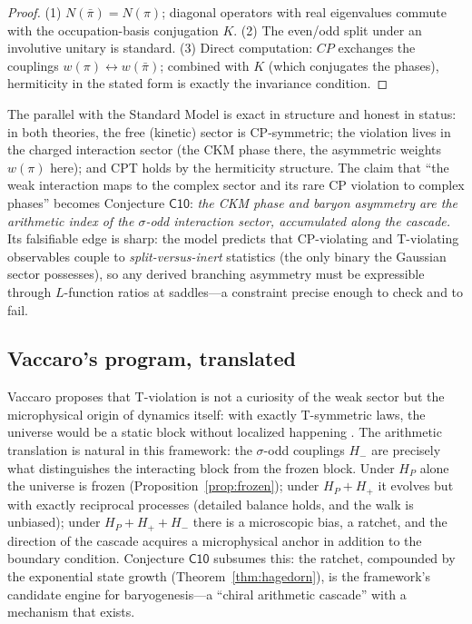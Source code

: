\begin{proof}
(1) $N(\bar\pi)=N(\pi)$; diagonal operators with real eigenvalues commute with the
occupation-basis conjugation $K$. (2) The even/odd split under an involutive unitary is
standard. (3) Direct computation: $CP$ exchanges the couplings $w(\pi)\leftrightarrow
w(\bar\pi)$; combined with $K$ (which conjugates the phases), hermiticity in the stated
form is exactly the invariance condition.
\end{proof}

The parallel with the Standard Model is exact in structure and honest in status: in both
theories, the free (kinetic) sector is CP-symmetric; the violation lives in the charged
interaction sector (the CKM phase there, the asymmetric weights $w(\pi)$ here); and CPT
holds by the hermiticity structure. The claim that ``the weak interaction maps to
the complex sector and its rare CP violation to complex phases'' becomes Conjecture
$\mathsf{C10}$: \emph{the CKM phase and baryon asymmetry are the arithmetic index of the
$\sigma$-odd interaction sector, accumulated along the cascade.} Its falsifiable edge is
sharp: the model predicts that CP-violating and T-violating observables couple to
\emph{split-versus-inert} statistics (the only binary the Gaussian sector possesses), so
any derived branching asymmetry must be expressible through $L$-function ratios at
saddles---a constraint precise enough to check and to fail.

\subsection{Vaccaro's program, translated}

Vaccaro proposes that T-violation is not a curiosity of the weak sector but the
microphysical origin of dynamics itself: with exactly T-symmetric laws, the universe would
be a static block without localized happening \cite{vaccaro2016}. The arithmetic translation
is natural in this framework: the $\sigma$-odd couplings
$H_{-}$ are precisely what distinguishes the interacting block from the frozen block. Under
$H_{P}$ alone the universe is frozen (Proposition~\ref{prop:frozen}); under
$H_{P}+H_{+}$ it evolves but with exactly reciprocal processes (detailed balance holds, and
the walk is unbiased); under $H_{P}+H_{+}+H_{-}$ there is a microscopic bias, a ratchet,
and the direction of the cascade acquires a microphysical anchor in addition to the
boundary condition. Conjecture $\mathsf{C10}$ subsumes this: the ratchet, compounded by the
exponential state growth (Theorem~\ref{thm:hagedorn}), is the framework's candidate engine
for baryogenesis---a ``chiral arithmetic cascade'' with a mechanism that
exists.

